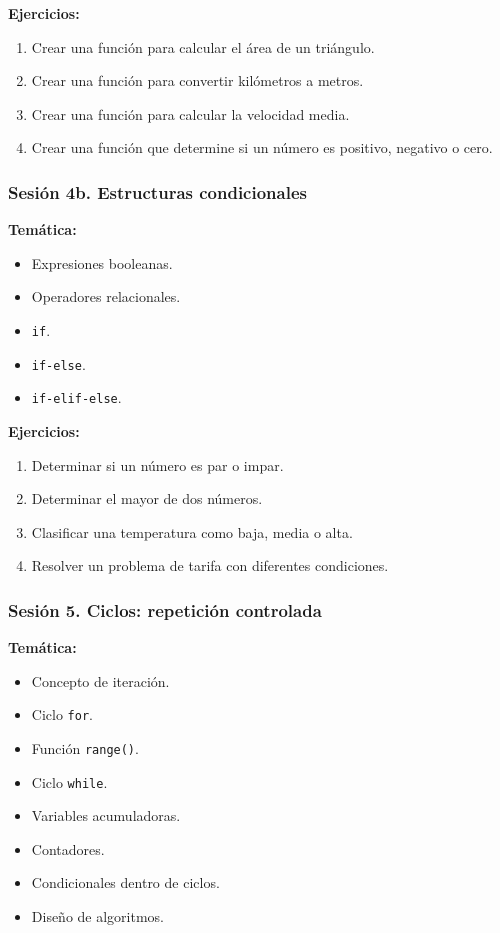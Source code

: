 \documentclass[12pt,letterpaper]{article}
\begin{document}
\textbf{Ejercicios:}
\begin{enumerate}[noitemsep]
    \item Crear una función para calcular el área de un triángulo.
    \item Crear una función para convertir kilómetros a metros.
    \item Crear una función para calcular la velocidad media.
    \item Crear una función que determine si un número es positivo,
    negativo o cero.
\end{enumerate}

\subsubsection*{Sesión 4b. Estructuras condicionales}

\textbf{Temática:}
\begin{itemize}[noitemsep]
    \item Expresiones booleanas.
    \item Operadores relacionales.
    \item \texttt{if}.
    \item \texttt{if-else}.
    \item \texttt{if-elif-else}.
\end{itemize}
\textbf{Ejercicios:}
\begin{enumerate}[noitemsep]
    \item Determinar si un número es par o impar.
    \item Determinar el mayor de dos números.
    \item Clasificar una temperatura como baja, media o alta.
    \item Resolver un problema de tarifa con diferentes condiciones.
\end{enumerate}

\subsubsection*{Sesión 5. Ciclos: repetición controlada}

\textbf{Temática:}
\begin{itemize}[noitemsep]
    \item Concepto de iteración.
    \item Ciclo \texttt{for}.
    \item Función \texttt{range()}.
    \item Ciclo \texttt{while}.
    \item Variables acumuladoras.
    \item Contadores.
    \item Condicionales dentro de ciclos.
    \item Diseño de algoritmos.
\end{itemize}
\end{document}
